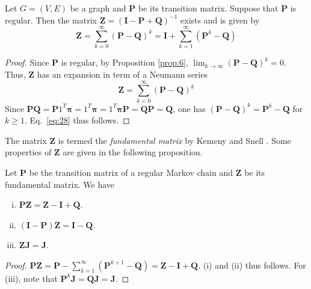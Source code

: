 \begin{proposition}
  \label{prop:7}
  Let $G = (V,E)$ be a graph and $\mathbf{P}$ be its transition
  matrix. Suppose that $\mathbf{P}$ is regular. Then the matrix $\mathbf{Z} =
  (\mathbf{I} - \mathbf{P} + \mathbf{Q})^{-1}$ exists and is given by
  \begin{equation}
    \label{eq:28}
    \mathbf{Z} = \sum_{k=0}^{\infty}(\mathbf{P} - \mathbf{Q})^{k} = \mathbf{I} +
    \sum_{k=1}^{\infty}(\mathbf{P}^{k} - \mathbf{Q})
  \end{equation}
  
\end{proposition}
\begin{proof}
  Since $\mathbf{P}$ is regular, by Proposition \ref{prop:6}, $\lim_{k
    \rightarrow \infty}(\mathbf{P} - \mathbf{Q})^{k} = 0$. Thus, $\mathbf{Z}$ has
  an expansion in term of a Neumann series
  \begin{equation}
    \label{eq:29}
    \mathbf{Z} = \sum_{k=0}^{\infty}(\mathbf{P} - \mathbf{Q})^{k}
  \end{equation}
  Since $\mathbf{P}\mathbf{Q} = \mathbf{P}1^{T}\mathbf{\pi} = 1^{T}\mathbf{\pi} = 
  1^{T}\mathbf{\pi}\mathbf{P} = \mathbf{Q}\mathbf{P} = \mathbf{Q}$,  
  one has $(\mathbf{P} - \mathbf{Q})^{k} = \mathbf{P}^{k} - \mathbf{Q}$ for $k \geq
  1$. Eq.~\eqref{eq:28} thus follows. 
\end{proof}
The matrix $\mathbf{Z}$ is termed the {\em fundamental matrix}
by Kemeny and Snell \cite{kemeny83:_finit_markov_chain}. Some properties of
$\mathbf{Z}$ are given in the following proposition.
\begin{proposition}
  \label{prop:8}
  Let $\mathbf{P}$ be the transition matrix of a regular Markov chain and
  $\mathbf{Z}$ be its fundamental matrix. We have
  \begin{enumerate}[(i)]
  \item $\mathbf{P}\mathbf{Z} = \mathbf{Z} - \mathbf{I} + \mathbf{Q}$. 
  \item $(\mathbf{I} - \mathbf{P})\mathbf{Z} = \mathbf{I} - \mathbf{Q}$.
  \item $\mathbf{Z} \mathbf{J} = \mathbf{J}$. 
  \end{enumerate}
\end{proposition}
\begin{proof}
  $\mathbf{P}\mathbf{Z} = \mathbf{P} - \sum_{k=1}^{\infty}(\mathbf{P}^{k+1} - \mathbf{Q})
  = \mathbf{Z} - \mathbf{I} + \mathbf{Q}$. (i) and (ii) thus follows. For (iii),
  note that $\mathbf{P}^{k}\mathbf{J} = \mathbf{Q}\mathbf{J} = \mathbf{J}$. 
\end{proof}
